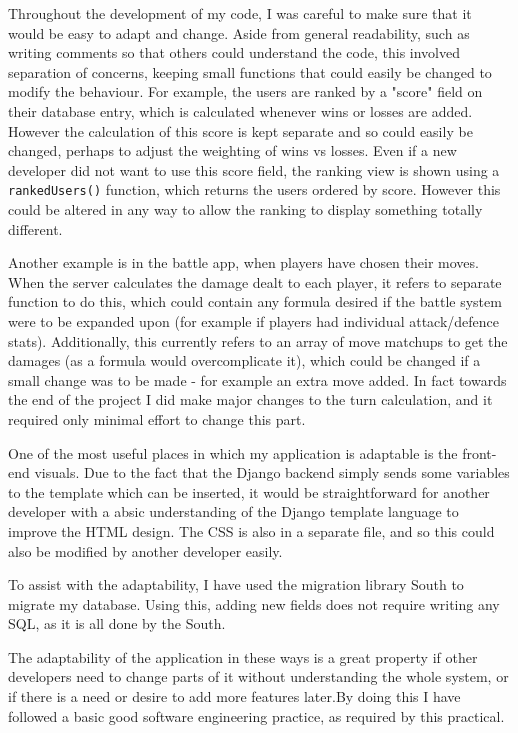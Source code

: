 \documentclass{article}
\begin{document}
Throughout the development of my code, I was careful to make sure that it would be easy to adapt and change. Aside from general readability, such as writing comments so that others could understand the code, this involved separation of concerns, keeping small functions that could easily be changed to modify the behaviour. For example, the users are ranked by a "score" field on their database entry, which is calculated whenever wins or losses are added. However the calculation of this score is kept separate and so could easily be changed, perhaps to adjust the weighting of wins vs losses. Even if a new developer did not want to use this score field, the ranking view is shown using a \texttt{rankedUsers()} function, which returns the users ordered by score. However this could be altered in any way to allow the ranking to display something totally different. 

Another example is in the battle app, when players have chosen their moves. When the server calculates the damage dealt to each player, it refers to separate function to do this, which could contain any formula desired if the battle system were to be expanded upon (for example if players had individual attack/defence stats). Additionally, this currently refers to an array of move matchups to get the damages (as a formula would overcomplicate it), which could be changed if a small change was to be made - for example an extra move added. In fact towards the end of the project I did make major changes to the turn calculation, and it required only minimal effort to change this part.

One of the most useful places in which my application is adaptable is the front-end visuals. Due to the fact that the Django backend simply sends some variables to the template which can be inserted, it would be straightforward for another developer with a absic understanding of the Django template language to improve the HTML design. The CSS is also in a separate file, and so this could also be modified by another developer easily.

To assist with the adaptability, I have used the migration library South to migrate my database. Using this, adding new fields does not require writing any SQL, as it is all done by the South.

The adaptability of the application in these ways is a great property if other developers need to change parts of it without understanding the whole system, or if there is a need or desire to add more features later.By doing this I have followed a basic good software engineering practice, as required by this practical.
\end{document}
